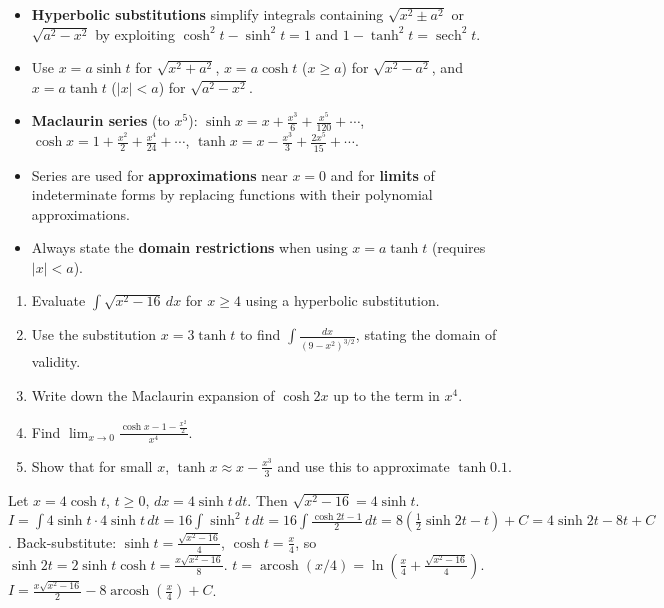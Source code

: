 \documentclass[11pt]{article}
\begin{document}
\begin{aretenir}
\begin{itemize}
\item \textbf{Hyperbolic substitutions} simplify integrals containing $\sqrt{x^2 \pm a^2}$ or $\sqrt{a^2 - x^2}$ by exploiting $\cosh^2 t - \sinh^2 t = 1$ and $1 - \tanh^2 t = \operatorname{sech}^2 t$.
\item Use $x = a\sinh t$ for $\sqrt{x^2 + a^2}$, $x = a\cosh t$ ($x \ge a$) for $\sqrt{x^2 - a^2}$, and $x = a\tanh t$ ($|x| < a$) for $\sqrt{a^2 - x^2}$.
\item \textbf{Maclaurin series} (to $x^5$):
      $\sinh x = x + \frac{x^3}{6} + \frac{x^5}{120} + \cdots$,
      $\cosh x = 1 + \frac{x^2}{2} + \frac{x^4}{24} + \cdots$,
      $\tanh x = x - \frac{x^3}{3} + \frac{2x^5}{15} + \cdots$.
\item Series are used for \textbf{approximations} near $x=0$ and for \textbf{limits} of indeterminate forms by replacing functions with their polynomial approximations.
\item Always state the \textbf{domain restrictions} when using $x = a\tanh t$ (requires $|x| < a$).
\end{itemize}
\end{aretenir}

\begin{exercice}
\begin{enumerate}
\item Evaluate $\displaystyle \int \sqrt{x^2 - 16}\,dx$ for $x \ge 4$ using a hyperbolic substitution.
\item Use the substitution $x = 3\tanh t$ to find $\displaystyle \int \frac{dx}{(9 - x^2)^{3/2}}$, stating the domain of validity.
\item Write down the Maclaurin expansion of $\cosh 2x$ up to the term in $x^4$.
\item Find $\displaystyle \lim_{x\to 0} \frac{\cosh x - 1 - \frac{x^2}{2}}{x^4}$.
\item Show that for small $x$, $\tanh x \approx x - \frac{x^3}{3}$ and use this to approximate $\tanh 0.1$.
\end{enumerate}
\end{exercice}

\begin{corrige}[Exercise 1]
Let $x = 4\cosh t$, $t \ge 0$, $dx = 4\sinh t\,dt$. Then $\sqrt{x^2 - 16} = 4\sinh t$.
$I = \int 4\sinh t \cdot 4\sinh t\,dt = 16\int \sinh^2 t\,dt = 16\int \frac{\cosh 2t - 1}{2}\,dt = 8\left(\frac{1}{2}\sinh 2t - t\right) + C = 4\sinh 2t - 8t + C$.
Back-substitute: $\sinh t = \frac{\sqrt{x^2-16}}{4}$, $\cosh t = \frac{x}{4}$, so $\sinh 2t = 2\sinh t\cosh t = \frac{x\sqrt{x^2-16}}{8}$.
$t = \operatorname{arcosh}(x/4) = \ln\left(\frac{x}{4} + \frac{\sqrt{x^2-16}}{4}\right)$.
$I = \frac{x\sqrt{x^2-16}}{2} - 8\operatorname{arcosh}\left(\frac{x}{4}\right) + C$.
\end{corrige}
\end{document}
